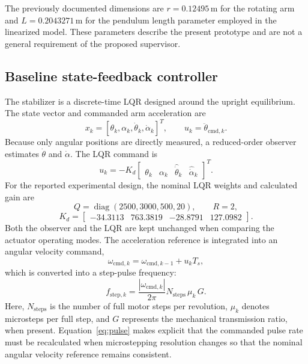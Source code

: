 \documentclass[conference]{IEEEtran}
\begin{document}
The previously documented dimensions are $r=0.12495\,\mathrm{m}$ for the rotating arm and $L=0.2043271\,\mathrm{m}$ for the pendulum length parameter employed in the linearized model. These parameters describe the present prototype and are not a general requirement of the proposed supervisor.


\subsection{Baseline state-feedback controller}
The stabilizer is a discrete-time LQR designed around the upright equilibrium. The state vector and commanded arm acceleration are
\begin{equation}
 x_k = [\theta_k,\alpha_k,\dot\theta_k,\dot\alpha_k]^T,\qquad
 u_k=\ddot\theta_{\mathrm{cmd},k}.
 \label{eq:state}
\end{equation}
Because only angular positions are directly measured, a reduced-order observer estimates $\dot\theta$ and $\dot\alpha$. The LQR command is
\begin{equation}
 u_k=-K_d\begin{bmatrix}
 \theta_k & \alpha_k & \hat{\dot\theta}_k & \hat{\dot\alpha}_k
 \end{bmatrix}^{T}.
 \label{eq:lqr}
\end{equation}
For the reported experimental design, the nominal LQR weights and calculated gain are
\begin{equation}
 Q=\operatorname{diag}(2500,3000,500,20),\qquad R=2,
\end{equation}
\begin{equation}
 K_d=\begin{bmatrix}-34.3113 & 763.3819 & -28.8791 & 127.0982\end{bmatrix}.
 \label{eq:gain}
\end{equation}
Both the observer and the LQR are kept unchanged when comparing the actuator operating modes. The acceleration reference is integrated into an angular velocity command,
\begin{equation}
 \omega_{\mathrm{cmd},k}=\omega_{\mathrm{cmd},k-1}+u_k T_s,
 \label{eq:int}
\end{equation}
which is converted into a step-pulse frequency:
\begin{equation}
 f_{\mathrm{step},k}=\frac{|\omega_{\mathrm{cmd},k}|}{2\pi}
 N_{\mathrm{steps}}\,\mu_k\,G.
 \label{eq:pulse}
\end{equation}
Here, $N_{\mathrm{steps}}$ is the number of full motor steps per revolution, $\mu_k$ denotes microsteps per full step, and $G$ represents the mechanical transmission ratio, when present. Equation~\eqref{eq:pulse} makes explicit that the commanded pulse rate must be recalculated when microstepping resolution changes so that the nominal angular velocity reference remains consistent.
\end{document}
